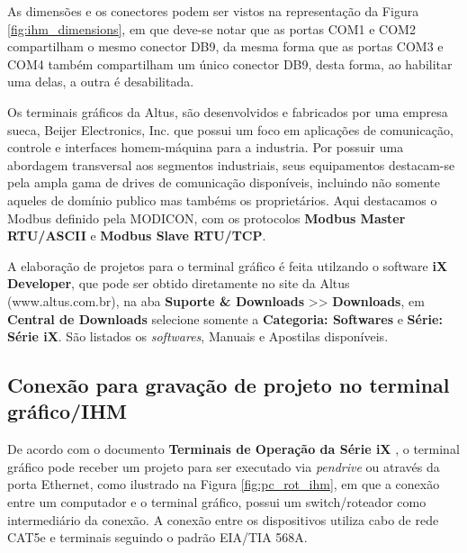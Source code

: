 As dimensões e os conectores podem ser vistos na representação da Figura \ref{fig:ihm_dimensions}, em que deve-se notar que as portas COM1 e COM2 compartilham o mesmo conector DB9, da mesma forma que as portas COM3 e COM4 também compartilham um único conector DB9, desta forma, ao habilitar uma delas, a outra é desabilitada. 

\begin{figure}[ht!]
	\centering
\end{figure}


Os terminais gráficos da Altus, são desenvolvidos e fabricados por uma empresa sueca, Beijer Electronics, Inc. que possui um foco em aplicações de comunicação, controle e interfaces homem-máquina para a industria. 
Por possuir uma abordagem transversal aos segmentos industriais, seus equipamentos destacam-se pela ampla gama de drives de comunicação disponíveis, incluindo não somente aqueles de domínio publico mas tambéms os proprietários. 
Aqui destacamos o Modbus definido pela MODICON, com os protocolos \textbf{Modbus Master RTU/ASCII} e \textbf{Modbus Slave RTU/TCP}.


A elaboração de projetos para o terminal gráfico é feita utilzando o software \textbf{iX Developer}, que pode ser obtido diretamente no site da Altus (www.altus.com.br), na aba \textbf{Suporte \& Downloads} >> \textbf{Downloads}, em \textbf{Central de Downloads} selecione somente a \textbf{Categoria: Softwares} e \textbf{Série: Série iX}. São listados os \textit{softwares}, Manuais e Apostilas disponíveis.


\subsection{Conexão para gravação de projeto no terminal gráfico/IHM}


De acordo com o documento \textbf{Terminais de Operação da Série iX} \cite{terminais_operacao_serie_ix}, o terminal gráfico pode receber um projeto para ser executado via \textit{pendrive} ou através da porta Ethernet, como ilustrado na Figura \ref{fig:pc_rot_ihm}, em que a conexão entre um computador e o terminal gráfico, possui um switch/roteador como intermediário da conexão. 
A conexão entre os dispositivos utiliza cabo de rede CAT5e e terminais seguindo o padrão EIA/TIA 568A. 


